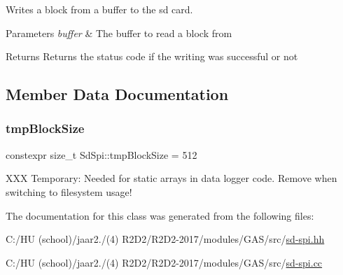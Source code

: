 Writes a block from a buffer to the sd card. 


\begin{DoxyParams}{Parameters}
{\em buffer} & The buffer to read a block from \\
\hline
\end{DoxyParams}
\begin{DoxyReturn}{Returns}
Returns the status code if the writing was successful or not 
\end{DoxyReturn}


\subsection{Member Data Documentation}
\mbox{\label{class_sd_spi_a2eedef2fa6ec9844743e4e0de6f03261}} 
\subsubsection{\texorpdfstring{tmp\+Block\+Size}{tmpBlockSize}}
{\footnotesize\ttfamily constexpr size\+\_\+t Sd\+Spi\+::tmp\+Block\+Size = 512\hspace{0.3cm}{\ttfamily [static]}}

X\+XX Temporary\+: Needed for static arrays in data logger code. Remove when switching to filesystem usage! 

The documentation for this class was generated from the following files\+:\begin{DoxyCompactItemize}
\item 
C\+:/\+H\+U (school)/jaar2./(4) R2\+D2/\+R2\+D2-\/2017/modules/\+G\+A\+S/src/\hyperlink{sd-spi_8hh}{sd-\/spi.\+hh}\item 
C\+:/\+H\+U (school)/jaar2./(4) R2\+D2/\+R2\+D2-\/2017/modules/\+G\+A\+S/src/\hyperlink{sd-spi_8cc}{sd-\/spi.\+cc}\end{DoxyCompactItemize}
